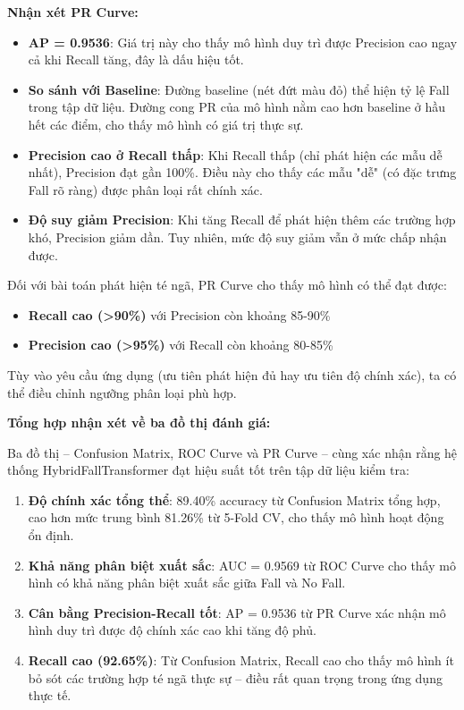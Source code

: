 \textbf{Nhận xét PR Curve:}
\begin{itemize}
    \item \textbf{AP = 0.9536}: Giá trị này cho thấy mô hình duy trì được Precision cao ngay cả khi Recall tăng, đây là dấu hiệu tốt.
    \item \textbf{So sánh với Baseline}: Đường baseline (nét đứt màu đỏ) thể hiện tỷ lệ Fall trong tập dữ liệu. Đường cong PR của mô hình nằm cao hơn baseline ở hầu hết các điểm, cho thấy mô hình có giá trị thực sự.
    \item \textbf{Precision cao ở Recall thấp}: Khi Recall thấp (chỉ phát hiện các mẫu dễ nhất), Precision đạt gần 100\%. Điều này cho thấy các mẫu "dễ" (có đặc trưng Fall rõ ràng) được phân loại rất chính xác.
    \item \textbf{Độ suy giảm Precision}: Khi tăng Recall để phát hiện thêm các trường hợp khó, Precision giảm dần. Tuy nhiên, mức độ suy giảm vẫn ở mức chấp nhận được.
\end{itemize}

Đối với bài toán phát hiện té ngã, PR Curve cho thấy mô hình có thể đạt được:
\begin{itemize}
    \item \textbf{Recall cao (>90\%)} với Precision còn khoảng 85-90\%
    \item \textbf{Precision cao (>95\%)} với Recall còn khoảng 80-85\%
\end{itemize}

Tùy vào yêu cầu ứng dụng (ưu tiên phát hiện đủ hay ưu tiên độ chính xác), ta có thể điều chỉnh ngưỡng phân loại phù hợp.

\vskip 0.5cm

\textbf{Tổng hợp nhận xét về ba đồ thị đánh giá:}

Ba đồ thị -- Confusion Matrix, ROC Curve và PR Curve -- cùng xác nhận rằng hệ thống HybridFallTransformer đạt hiệu suất tốt trên tập dữ liệu kiểm tra:

\begin{enumerate}
    \item \textbf{Độ chính xác tổng thể}: 89.40\% accuracy từ Confusion Matrix tổng hợp, cao hơn mức trung bình 81.26\% từ 5-Fold CV, cho thấy mô hình hoạt động ổn định.
    
    \item \textbf{Khả năng phân biệt xuất sắc}: AUC = 0.9569 từ ROC Curve cho thấy mô hình có khả năng phân biệt xuất sắc giữa Fall và No Fall.
    
    \item \textbf{Cân bằng Precision-Recall tốt}: AP = 0.9536 từ PR Curve xác nhận mô hình duy trì được độ chính xác cao khi tăng độ phủ.
    
    \item \textbf{Recall cao (92.65\%)}: Từ Confusion Matrix, Recall cao cho thấy mô hình ít bỏ sót các trường hợp té ngã thực sự -- điều rất quan trọng trong ứng dụng thực tế.
\end{enumerate}

